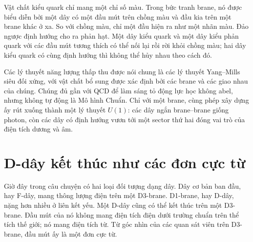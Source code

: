 
Vật chất kiểu quark chỉ mang một chỉ số màu. Trong bức tranh brane, nó được biểu diễn bởi một dây có một đầu mút trên chồng màu và đầu kia trên một brane khác ở xa. So với chồng màu, chỉ một đầu hiện ra như một nhãn màu. Đảo ngược định hướng cho ra phản hạt. Một dây kiểu quark và một dây kiểu phản quark với các đầu mút tương thích có thể nối lại rồi rời khỏi chồng màu; hai dây kiểu quark có cùng định hướng thì không thể hủy nhau theo cách đó.

Các lý thuyết năng lượng thấp thu được nói chung là các lý thuyết Yang--Mills siêu đối xứng, với vật chất bổ sung được xác định bởi các brane và các giao nhau của chúng. Chúng đủ gần với QCD để làm sáng tỏ động lực học không abel, nhưng không tự động là Mô hình Chuẩn. Chỉ với một brane, cùng phép xây dựng ấy rút xuống thành một lý thuyết \(U(1)\): các dây ngắn brane--brane giống photon, còn các dây có định hướng vươn tới một sector thứ hai đóng vai trò của điện tích dương và âm.

\section{D-dây kết thúc như các đơn cực từ}

Giờ đây trong câu chuyện có hai loại đối tượng dạng dây. Dây cơ bản ban đầu, hay F-dây, mang thông lượng điện trên một D3-brane. D1-brane, hay D-dây, nặng hơn nhiều ở liên kết yếu. Một D-dây cũng có thể kết thúc trên một D3-brane. Đầu mút của nó không mang điện tích điện dưới trường chuẩn trên thể tích thế giới; nó mang điện tích từ. Từ góc nhìn của các quan sát viên trên D3-brane, đầu mút ấy là một đơn cực từ.

